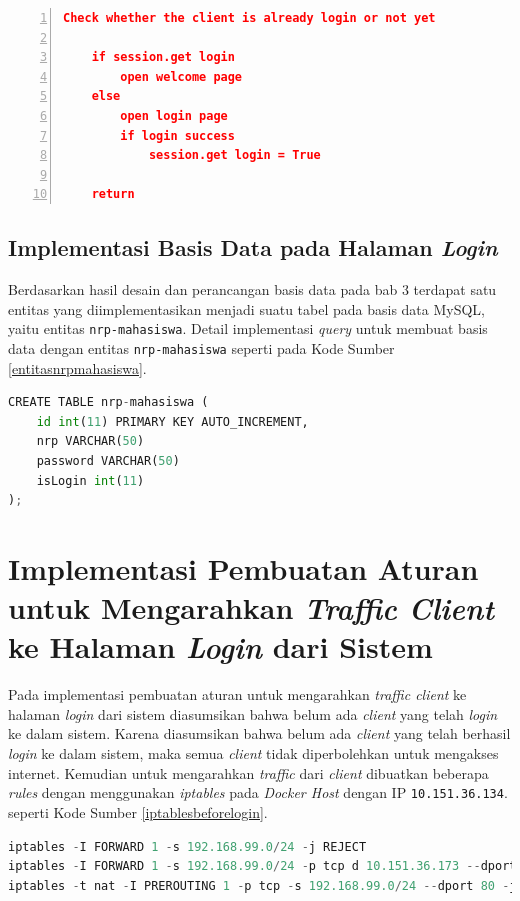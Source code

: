 \begin{minipage}{\linewidth}  
	\begin{lstlisting}[numbers=left, frame=single,tabsize=2,breaklines,caption={Pseudocode Web Service},label=pseudocodehalamanlogin,language=json]
	Check whether the client is already login or not yet
	
	if session.get login
		open welcome page
	else
		open login page
		if login success
			session.get login = True	  
	
	return  	
	\end{lstlisting}
\end{minipage}


\subsection{Implementasi Basis Data pada Halaman \textit{Login}}
Berdasarkan hasil desain dan perancangan basis data pada bab 3 terdapat satu entitas yang diimplementasikan menjadi suatu tabel pada basis data MySQL, yaitu entitas \texttt{nrp-mahasiswa}. Detail implementasi \textit{query} untuk membuat basis data dengan entitas \texttt{nrp-mahasiswa} seperti pada Kode Sumber \ref{entitasnrpmahasiswa}.\\
\begin{lstlisting}[frame=single,tabsize=2,breaklines,captionpos=b,language=python, caption=\textit{Query} untuk membuat tabel testing,label=entitasnrpmahasiswa]
CREATE TABLE nrp-mahasiswa (
	id int(11) PRIMARY KEY AUTO_INCREMENT,
	nrp VARCHAR(50)
	password VARCHAR(50)
	isLogin int(11)
);
\end{lstlisting}


\section{Implementasi Pembuatan Aturan untuk Mengarahkan \textit{Traffic Client} ke Halaman \textit{Login} dari Sistem}
Pada implementasi pembuatan aturan untuk mengarahkan \textit{traffic client} ke halaman \textit{login} dari sistem diasumsikan bahwa belum ada \textit{client} yang telah \textit{login} ke dalam sistem. Karena diasumsikan bahwa belum ada \textit{client} yang telah berhasil \textit{login} ke dalam sistem, maka semua \textit{client} tidak diperbolehkan untuk mengakses internet. Kemudian untuk mengarahkan \textit{traffic} dari \textit{client} dibuatkan beberapa \textit{rules} dengan menggunakan \textit{iptables} pada \textit{Docker Host} dengan IP \texttt{10.151.36.134}. seperti Kode Sumber \ref{iptablesbeforelogin}.
\begin{lstlisting}[frame=single,tabsize=2,breaklines,captionpos=b,caption=Command untuk mengarahkan \textit{client} ke halaman \textit{login},language=Python,label=iptablesbeforelogin]
iptables -I FORWARD 1 -s 192.168.99.0/24 -j REJECT
iptables -I FORWARD 1 -s 192.168.99.0/24 -p tcp d 10.151.36.173 --dport 4000 -j ACCEPT
iptables -t nat -I PREROUTING 1 -p tcp -s 192.168.99.0/24 --dport 80 -j DNAT --to 10.151.36.173:4000
\end{lstlisting}

